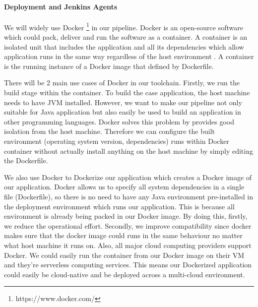 \paragraph[]{Deployment and Jenkins Agents}
We will widely use Docker \footnote{https://www.docker.com/} in our pipeline.  Docker is an open-source software which could pack, deliver and run the software as a container. A container is an isolated unit that includes the application and all its dependencies which allow application runs in the same way regardless of the host environment \cite{WhatisaC60:online}. A container is the running instance of a Docker image that defined by Dockerfile.
\par    
\label{docker}
There will be 2 main use cases of Docker in our toolchain. Firstly, we run the build stage within the container. To build the case application, the host machine needs to have JVM installed. However, we want to make our pipeline not only suitable for Java application but also easily be used to build an application in other programming languages. Docker solves this problem by provides good isolation from the host machine. Therefore we can configure the built environment (operating system version, dependencies) runs within Docker container  without actually install anything on the host machine by simply editing the Dockerfile.
\par
We also use Docker to Dockerize our application which creates a Docker image of our application.
Docker allows us to specify all system dependencies in a single file (Dockerfile), so there is no need to have any Java environment pre-installed in the deployment environment which runs our application. This is because all environment is already being packed in our Docker image. By doing this, firstly, we reduce the operational effort. Secondly, we improve compatibility since docker makes sure that the docker image could runs in the same behaviour no matter what host machine it runs on. Also, all major cloud computing providers support Docker. We could easily run the container from our Docker image on their VM and they're serverless computing services. This means our Dockerized application could easily be cloud-native and be deployed across a multi-cloud environment.
